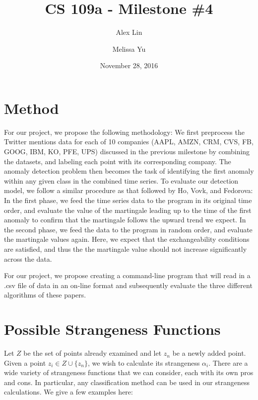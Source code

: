 \documentclass[11pt, margin=1in]{article}
\begin{document}
\title{CS 109a - Milestone \#4}
\author{Alex Lin \and Melissa Yu}
\date{November 28, 2016}
\maketitle

\section{Method}
For our project, we propose the following methodology: We first preprocess the Twitter mentions data for each of 10 companies (AAPL, AMZN, CRM, CVS, FB, GOOG, IBM, KO, PFE, UPS) discussed in the previous milestone by combining the datasets, and labeling each point with its corresponding company. The anomaly detection problem then becomes the task of identifying the first anomaly within any given class in the combined time series. To evaluate our detection model, we follow a similar procedure as that followed by Ho, Vovk, and Fedorova: In the first phase, we feed the time series data to the program in its original time order, and evaluate the value of the martingale leading up to the time of the first anomaly to confirm that the martingale follows the upward trend we expect. In the second phase, we feed the data to the program in random order, and evaluate the martingale values again. Here, we expect that the exchangeability conditions are satisfied, and thus the the martingale value should not increase significantly across the data. 

For our project, we propose creating a command-line program that will read in a .csv file of data in an on-line format and subsequently evaluate the three different algorithms of these papers.

\section{Possible Strangeness Functions}

Let $Z$ be the set of points already examined and let $z_n$ be a newly added point.  Given a point $z_i \in Z \cup \{z_n\}$, we wish to calculate its strangeness $\alpha_i$.  There are a wide variety of strangeness functions that we can consider, each with its own pros and cons.  In particular, any classification method can be used in our strangeness calculations.  We give a few examples here:
\end{document}
